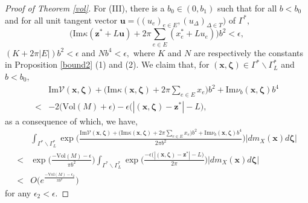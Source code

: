 \documentclass[11pt]{article}
\renewcommand{\setminus}{{\smallsetminus}}
\theoremstyle{remark}
\theoremstyle{remark}
\numberwithin{equation}{section}
\begin{document}
\begin{proof}[Proof of Theorem \ref{vol}]
For (III), there  is a $b_0\in (0, b_1)$ such that for all $b<b_0$ and for all unit tangent vector $\mathbf u=\big((u_e)_{e\in E},(u_\Delta)_{\Delta\in T}\big)$ of $\Gamma^*,$
\begin{equation}\label{ImKK}
\Big(\mathrm{Im}\kappa(\boldsymbol z^* + L\mathbf u) + 2\pi \sum_{e\in E} (x_e^*+ L u_e ) \Big)b^2<\epsilon,
\end{equation}
$(K+2\pi|E|)b^2<\epsilon$ and $Nb^4<\epsilon,$ where $K$ and $N$ are respectively the constants in Proposition \ref{bound2} (1) and (2). We claim that, for $(\boldsymbol x,\boldsymbol \zeta)\in\Gamma^*\setminus \Gamma^*_L$ and $b<b_0,$ 
\begin{equation}\label{cll}
\begin{split}
&\mathrm{Im}\mathcal V(\boldsymbol  x,\boldsymbol \zeta)+\Big(\mathrm{Im}\kappa(\boldsymbol x,\boldsymbol \zeta)+ 2\pi \sum_{e\in E}x_e\Big)b^2+\mathrm{Im}\nu_b(\boldsymbol  x,\boldsymbol \zeta)b^4\\
<&-2\big(\mathrm{Vol}(M)+\epsilon\big)-\epsilon\big(|(\boldsymbol x,\boldsymbol \zeta)-\boldsymbol z^*|-L\big),
\end{split}
\end{equation}
as a consequence of which, we have,
\begin{equation}\label{CII}
\begin{split}
& \int_{\Gamma^*\setminus \Gamma^*_L}\exp\bigg(\frac{\mathrm{Im}\mathcal V(\boldsymbol  x,\boldsymbol \zeta)+\big(\mathrm{Im}\kappa(\boldsymbol x,\boldsymbol \zeta)+ 2\pi \sum_{e\in E}x_e\big)b^2+\mathrm{Im}\nu_b(\boldsymbol  x,\boldsymbol \zeta)b^4}{2\pi b^2} \bigg)|dm_X(\boldsymbol x)  d \boldsymbol \zeta| \\
 < &  \exp\bigg(\frac{-\mathrm{Vol}(M)-\epsilon}{\pi b^2}\bigg)\int_{\Gamma^*\setminus \Gamma^*_L}\exp\bigg(\frac{-\epsilon\big(|(\boldsymbol x,\boldsymbol \zeta)-\boldsymbol z^*|-L\big)}{2\pi}\bigg)|dm_X(\boldsymbol x)  d \boldsymbol \zeta| \\
< & O\Big(e^{\frac{-\mathrm{Vol}(M)-\epsilon_2}{\pi b^2}}\Big)
\end{split}
\end{equation}
for any $\epsilon_2<\epsilon.$ 


\end{proof}
\end{document}
